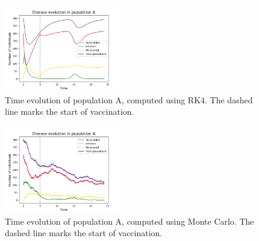 \documentclass[notitlepage, reprint, nofootinbib]{revtex4-1}
\begin{document}
\begin{figure}
	\centering
	\includegraphics[width=0.45\textwidth]{../Figures/RK4_popA_combo}
	\caption{Time evolution of population A, computed using RK4. The dashed line marks the start of vaccination.}
	\label{RK4_combo}
\end{figure}
\begin{figure}
	\centering
	\includegraphics[width=0.45\textwidth]{../Figures/MC_popA_combo}
	\caption{Time evolution of population A, computed using Monte Carlo. The dashed line marks the start of vaccination.}
	\label{MC_combo}
\end{figure}

\clearpage
\end{document}
